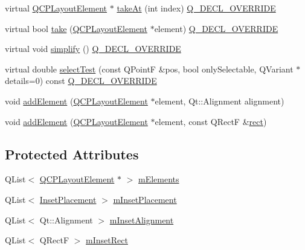 \begin{DoxyCompactItemize}
\item 
virtual \hyperlink{class_q_c_p_layout_element}{Q\+C\+P\+Layout\+Element} $\ast$ \hyperlink{class_q_c_p_layout_inset_abf2e8233f5b7051220907e62ded490a2}{take\+At} (int index) \hyperlink{qcustomplot_8h_a42cc5eaeb25b85f8b52d2a4b94c56f55}{Q\+\_\+\+D\+E\+C\+L\+\_\+\+O\+V\+E\+R\+R\+I\+DE}
\item 
virtual bool \hyperlink{class_q_c_p_layout_inset_af7f13cc369f8190b5e7e17d5f39dfe1c}{take} (\hyperlink{class_q_c_p_layout_element}{Q\+C\+P\+Layout\+Element} $\ast$element) \hyperlink{qcustomplot_8h_a42cc5eaeb25b85f8b52d2a4b94c56f55}{Q\+\_\+\+D\+E\+C\+L\+\_\+\+O\+V\+E\+R\+R\+I\+DE}
\item 
virtual void \hyperlink{class_q_c_p_layout_inset_a18b7d508f0baa60cc5dcb1343cf7f32a}{simplify} () \hyperlink{qcustomplot_8h_a42cc5eaeb25b85f8b52d2a4b94c56f55}{Q\+\_\+\+D\+E\+C\+L\+\_\+\+O\+V\+E\+R\+R\+I\+DE}
\item 
virtual double \hyperlink{class_q_c_p_layout_inset_a2eeef7ea1b8340e7c7c2e2fc229df5ea}{select\+Test} (const Q\+PointF \&pos, bool only\+Selectable, Q\+Variant $\ast$details=0) const \hyperlink{qcustomplot_8h_a42cc5eaeb25b85f8b52d2a4b94c56f55}{Q\+\_\+\+D\+E\+C\+L\+\_\+\+O\+V\+E\+R\+R\+I\+DE}
\item 
void \hyperlink{class_q_c_p_layout_inset_ad61529eb576af7f04dff94abb10c745a}{add\+Element} (\hyperlink{class_q_c_p_layout_element}{Q\+C\+P\+Layout\+Element} $\ast$element, Qt\+::\+Alignment alignment)
\item 
void \hyperlink{class_q_c_p_layout_inset_a8ff61fbee4a1f0ff45c398009d9f1e56}{add\+Element} (\hyperlink{class_q_c_p_layout_element}{Q\+C\+P\+Layout\+Element} $\ast$element, const Q\+RectF \&\hyperlink{class_q_c_p_layout_element_a208effccfe2cca4a0eaf9393e60f2dd4}{rect})
\end{DoxyCompactItemize}
\subsection*{Protected Attributes}
\begin{DoxyCompactItemize}
\item 
Q\+List$<$ \hyperlink{class_q_c_p_layout_element}{Q\+C\+P\+Layout\+Element} $\ast$ $>$ \hyperlink{class_q_c_p_layout_inset_a8fff7eae9a1be9a5c1e544fb379f682f}{m\+Elements}
\item 
Q\+List$<$ \hyperlink{class_q_c_p_layout_inset_a8b9e17d9a2768293d2a7d72f5e298192}{Inset\+Placement} $>$ \hyperlink{class_q_c_p_layout_inset_a57a0a4e445cc78eada29765ecf092abe}{m\+Inset\+Placement}
\item 
Q\+List$<$ Qt\+::\+Alignment $>$ \hyperlink{class_q_c_p_layout_inset_a55e9b84c310136ff985a6544184ab64a}{m\+Inset\+Alignment}
\item 
Q\+List$<$ Q\+RectF $>$ \hyperlink{class_q_c_p_layout_inset_aaa8f6b5029458f3d97a65239524a2b33}{m\+Inset\+Rect}
\end{DoxyCompactItemize}
